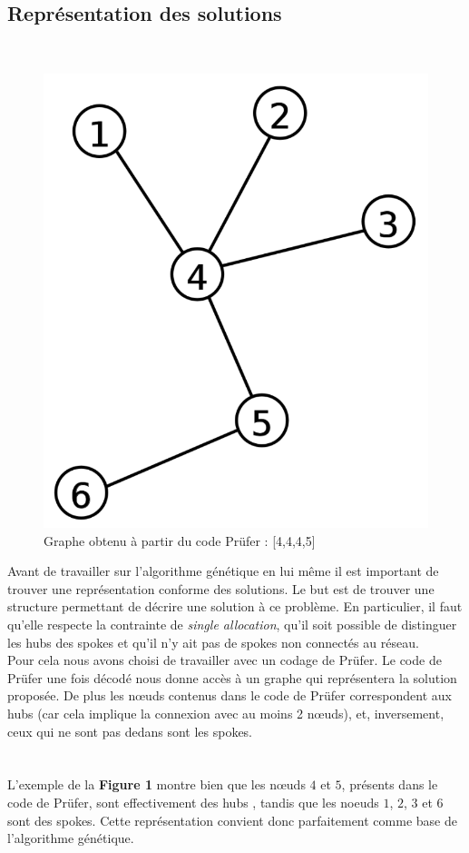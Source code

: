 \documentclass{article} %
\begin{document}
\subsection{Représentation des solutions}
~\\
\begin{figure}
	\centering
	\includegraphics[keepaspectratio = true,scale=0.2]{prufer.png}
	\caption{Graphe obtenu à partir du code Prüfer : [4,4,4,5]}
\end{figure}
Avant de travailler sur l'algorithme génétique en lui même il est important de trouver une représentation conforme des solutions. Le but est de trouver une structure permettant de décrire une solution à ce problème. En particulier, il faut qu'elle respecte la contrainte de \textit{single allocation}, qu'il soit possible de distinguer les hubs des spokes et qu'il n'y ait pas de spokes non connectés au réseau.\\

Pour cela nous avons choisi de travailler avec un codage de Prüfer. Le code de Prüfer une fois décodé nous donne accès à un graphe qui représentera la solution proposée. De plus les nœuds contenus dans le code de Prüfer correspondent aux hubs (car cela implique la connexion avec au moins 2 nœuds), et, inversement, ceux qui ne sont pas dedans sont les spokes.\\~\\~\\
L'exemple de la \textbf{Figure 1} montre bien que les nœuds $4$ et $5$, présents dans le code de Prüfer,  sont effectivement des hubs , tandis que les noeuds $1$, $2$, $3$ et $6$ sont des spokes. Cette représentation convient donc parfaitement comme base de l'algorithme génétique.
\end{document}
